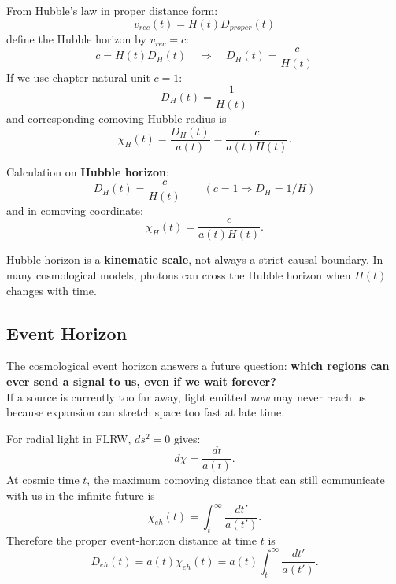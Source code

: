 \bigskip\noindent
\begin{foundation}
    From Hubble's law in proper distance form:
    \[
        v_{rec}(t)=H(t)D_{proper}(t)
    \]
    define the Hubble horizon by $v_{rec}=c$:
    \[
        c=H(t)D_H(t)
        \quad \Rightarrow \quad
        D_H(t)=\frac{c}{H(t)}
    \]
    If we use chapter natural unit $c=1$:
    \[
        D_H(t)=\frac{1}{H(t)}
    \]
    and corresponding comoving Hubble radius is
    \[
        \chi_H(t)=\frac{D_H(t)}{a(t)}=\frac{c}{a(t)H(t)}.
    \]
\end{foundation}

\bigskip\noindent
\begin{theory}
    Calculation on \textbf{Hubble horizon}:
    \[
        D_H(t)=\frac{c}{H(t)} \qquad (c=1 \Rightarrow D_H=1/H)
    \]
    and in comoving coordinate:
    \[
        \chi_H(t)=\frac{c}{a(t)H(t)}.
    \]
\end{theory}

\bigskip\noindent
\begin{remark}
    Hubble horizon is a \textbf{kinematic scale}, not always a strict causal boundary. In many cosmological models, photons can cross the Hubble horizon when $H(t)$ changes with time.
\end{remark}



\bigskip\noindent \bigskip\noindent \bigskip\noindent
\subsection{Event Horizon}
\begin{intuition}
    The cosmological event horizon answers a future question: \textbf{which regions can ever send a signal to us, even if we wait forever?} \\

    If a source is currently too far away, light emitted \emph{now} may never reach us because expansion can stretch space too fast at late time.
\end{intuition}

\bigskip\noindent
\begin{foundation}
    For radial light in FLRW, $ds^2=0$ gives:
    \[
        d\chi=\frac{dt}{a(t)}.
    \]
    At cosmic time $t$, the maximum comoving distance that can still communicate with us in the infinite future is
    \[
        \chi_{eh}(t)=\int_t^{\infty}\frac{dt'}{a(t')}.
    \]
    Therefore the proper event-horizon distance at time $t$ is
    \[
        D_{eh}(t)=a(t)\chi_{eh}(t)=a(t)\int_t^{\infty}\frac{dt'}{a(t')}.
    \]
\end{foundation}

